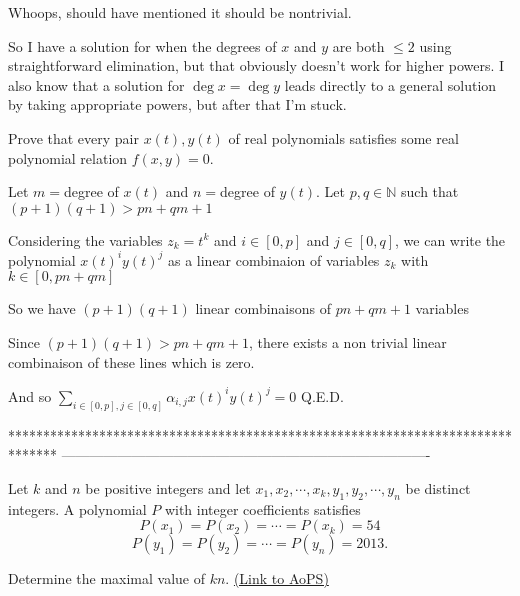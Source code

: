 \begin{solution}
	Whoops, should have mentioned it should be nontrivial.

So I have a solution for when the degrees of $ x $ and $ y $ are both $ \le 2 $ using straightforward elimination, but that obviously doesn't work for higher powers. I also know that a solution for $ \deg x = \deg y $ leads directly to a general solution by taking appropriate powers, but after that I'm stuck.
\end{solution}



\begin{solution}
	\begin{tcolorbox}Prove that every pair $ x(t), y(t) $ of real polynomials satisfies some real polynomial relation $ f(x, y)=0 $.\end{tcolorbox}
Let $m=$degree of $x(t)$ and $n=$degree of $y(t)$.
Let $p,q\in\mathbb N$ such that $(p+1)(q+1)> pn+qm+1$

Considering the variables $z_k=t^k$ and $i\in[0,p]$ and $j\in[0,q]$,
we can write the polynomial $x(t)^iy(t)^j$ as a linear combinaion of variables $z_k$ with $k\in[0,pn+qm]$

So we have $(p+1)(q+1)$ linear combinaisons of $pn+qm+1$ variables

Since $(p+1)(q+1)> pn+qm+1$, there exists a non trivial linear combinaison of these lines which is zero.

And so $\sum_{i\in[0,p],j\in[0,q]} \alpha_{i,j}x(t)^iy(t)^j=0$
Q.E.D.
\end{solution}
*******************************************************************************
-------------------------------------------------------------------------------

\begin{problem}
	Let $k$ and $n$ be positive integers and let $x_1, x_2, \cdots, x_k, y_1, y_2, \cdots, y_n$ be distinct integers. A polynomial $P$ with integer coefficients satisfies
 \[P(x_1)=P(x_2)= \cdots = P(x_k)=54\] 
\[P(y_1)=P(y_2)= \cdots = P(y_n)=2013.\]

Determine the maximal value of $kn$.
	\flushright \href{https://artofproblemsolving.com/community/c6h569069}{(Link to AoPS)}
\end{problem}



